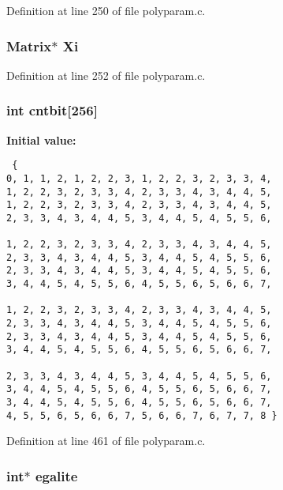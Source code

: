 Definition at line 250 of file polyparam.c.
\subsubsection{\setlength{\rightskip}{0pt plus 5cm}Matrix$\ast$ Xi\hspace{0.3cm}{\tt  [static]}}\label{polyparam_8c_a8}




Definition at line 252 of file polyparam.c.
\subsubsection{\setlength{\rightskip}{0pt plus 5cm}int cntbit[256]}\label{polyparam_8c_a17}


{\bf Initial value:}

\footnotesize\begin{verbatim} {                              
0, 1, 1, 2, 1, 2, 2, 3, 1, 2, 2, 3, 2, 3, 3, 4,
1, 2, 2, 3, 2, 3, 3, 4, 2, 3, 3, 4, 3, 4, 4, 5,
1, 2, 2, 3, 2, 3, 3, 4, 2, 3, 3, 4, 3, 4, 4, 5,
2, 3, 3, 4, 3, 4, 4, 5, 3, 4, 4, 5, 4, 5, 5, 6,

1, 2, 2, 3, 2, 3, 3, 4, 2, 3, 3, 4, 3, 4, 4, 5,
2, 3, 3, 4, 3, 4, 4, 5, 3, 4, 4, 5, 4, 5, 5, 6,
2, 3, 3, 4, 3, 4, 4, 5, 3, 4, 4, 5, 4, 5, 5, 6,
3, 4, 4, 5, 4, 5, 5, 6, 4, 5, 5, 6, 5, 6, 6, 7,

1, 2, 2, 3, 2, 3, 3, 4, 2, 3, 3, 4, 3, 4, 4, 5,
2, 3, 3, 4, 3, 4, 4, 5, 3, 4, 4, 5, 4, 5, 5, 6,
2, 3, 3, 4, 3, 4, 4, 5, 3, 4, 4, 5, 4, 5, 5, 6,
3, 4, 4, 5, 4, 5, 5, 6, 4, 5, 5, 6, 5, 6, 6, 7,

2, 3, 3, 4, 3, 4, 4, 5, 3, 4, 4, 5, 4, 5, 5, 6,
3, 4, 4, 5, 4, 5, 5, 6, 4, 5, 5, 6, 5, 6, 6, 7,
3, 4, 4, 5, 4, 5, 5, 6, 4, 5, 5, 6, 5, 6, 6, 7,
4, 5, 5, 6, 5, 6, 6, 7, 5, 6, 6, 7, 6, 7, 7, 8 }\end{verbatim}\normalsize 


Definition at line 461 of file polyparam.c.
\subsubsection{\setlength{\rightskip}{0pt plus 5cm}int$\ast$ egalite\hspace{0.3cm}{\tt  [static]}}\label{polyparam_8c_a7}




